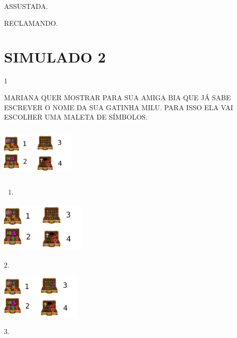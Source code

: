 \begin{escola}
{\begin{escolha}
\item ASSUSTADA.

\item RECLAMANDO.
\end{escolha}


\chapter{SIMULADO 2}

\num{1}

MARIANA QUER MOSTRAR PARA SUA AMIGA BIA QUE JÁ SABE ESCREVER O NOME DA
SUA GATINHA MILU. PARA ISSO ELA VAI ESCOLHER UMA MALETA DE SÍMBOLOS.

\includegraphics[width=1.40208in,height=1.03194in]{media/image209.png}

\begin{enumerate}
\def\labelenumi{\arabic{enumi}.}
\item
\end{enumerate}

\includegraphics[width=1.62986in,height=0.98819in]{media/image209.png}

2.

\includegraphics[width=1.55139in,height=0.85000in]{media/image209.png}

3.

}
\end{escola}
